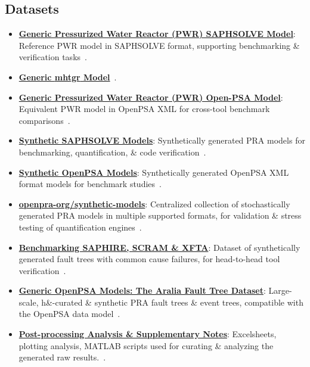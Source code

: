 \subsection{Datasets}
\begin{itemize}
    \item \textbf{\href{https://doi.org/10.5281/zenodo.13996959}{Generic Pressurized Water Reactor (PWR) SAPHSOLVE Model}}: Reference PWR model in SAPHSOLVE format, supporting benchmarking \& verification tasks~\cite{aras_generic_2024}.

    \item \textbf{\href{https://doi.org/10.5281/zenodo.14070453}{Generic \acrfull{mhtgr} Model}}~\cite{ hamza_openpra-orggeneric-mhtgr-model_2025}.
   
    \item \textbf{\href{https://doi.org/10.5281/zenodo.14070453}{Generic Pressurized Water Reactor (PWR) Open-PSA Model}}: Equivalent PWR model in OpenPSA XML for cross-tool benchmark comparisons~\cite{aras_generic_2024-1}.

    \item \textbf{\href{https://doi.org/10.5281/zenodo.13996735}{Synthetic SAPHSOLVE Models}}: Synthetically generated PRA models for benchmarking, quantification, \& code verification~\cite{aras_synthetic_2024}.
    
    \item \textbf{\href{https://doi.org/10.5281/zenodo.13996370}{Synthetic OpenPSA Models}}: Synthetically generated OpenPSA XML format models for benchmark studies~\cite{aras_synthetic_2024-1}.
    
    \item \textbf{\href{https://doi.org/10.5281/zenodo.15320670}{openpra-org/synthetic-models}}: Centralized collection of stochastically generated PRA models in multiple supported formats, for validation \& stress testing of quantification engines~\cite{aras_synthetic_2025}.
    
    \item \textbf{\href{https://doi.org/10.5281/zenodo.7706615}{Benchmarking SAPHIRE, SCRAM \& XFTA}}: Dataset of synthetically generated fault trees with common cause failures, for head-to-head tool verification~\cite{earthperson_dataset_2023}.
    
    \item \textbf{\href{https://doi.org/10.5281/zenodo.15293416}{Generic OpenPSA Models: The Aralia Fault Tree Dataset}}: Large-scale, h\&-curated \& synthetic PRA fault trees \& event trees, compatible with the OpenPSA data model~\cite{earthperson_generic_2021}.

    \item \textbf{\href{https://zenodo.org/doi/10.5281/zenodo.15320401}{Post-processing Analysis \& Supplementary Notes}}: Excelsheets, plotting analysis, MATLAB scripts used for curating \& analyzing the generated raw results.~\cite{earthperson_benchmarks_2025}.
\end{itemize}